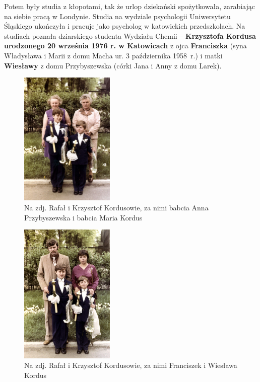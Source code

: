 Potem były studia z kłopotami, tak że urlop dziekański spożytkowała, zarabiając na siebie pracą w Londynie. Studia na wydziale psychologii Uniwersytetu Śląskiego ukończyła i pracuje jako psycholog w katowickich przedszkolach. Na studiach poznała dziarskiego studenta Wydziału Chemii – \textbf{Krzysztofa Kordusa urodzonego 20 września 1976 r. w Katowicach} z ojca \textbf{Franciszka} (syna Władysława i Marii z domu Macha ur. 3 października 1958~r.) i matki \textbf{Wiesławy} z domu Przybyszewska (córki Jana i Anny z domu Larek).
\begin{figure}[!h]
\begin{center}
\includegraphics[width=0.4\textwidth]{photo/krzysztof_kordus_komunia.jpg}
\caption[I Komunia św. Kordusów z babciami]{Na zdj. Rafał i Krzysztof Kordusowie, za nimi babcia Anna Przybyszewska i babcia Maria Kordus}
\end{center}
\end{figure}

\begin{figure}[!h]
\begin{center}
\includegraphics[width=0.4\textwidth]{photo/krzysztof_kordus_komunia_2.jpg}
\caption[I Komunia św. Kordusów z rodzicami]{Na zdj. Rafał i Krzysztof Kordusowie, za nimi Franciszek i Wiesława Kordus}
\end{center}
\end{figure}

